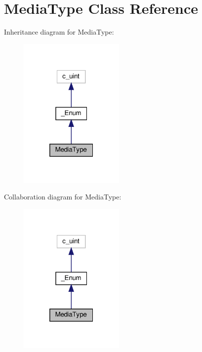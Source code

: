 \hypertarget{classvlc_1_1_media_type}{}\section{Media\+Type Class Reference}
\label{classvlc_1_1_media_type}


Inheritance diagram for Media\+Type\+:
\nopagebreak
\begin{figure}[H]
\begin{center}
\leavevmode
\includegraphics[width=145pt]{classvlc_1_1_media_type__inherit__graph}
\end{center}
\end{figure}


Collaboration diagram for Media\+Type\+:
\nopagebreak
\begin{figure}[H]
\begin{center}
\leavevmode
\includegraphics[width=145pt]{classvlc_1_1_media_type__coll__graph}
\end{center}
\end{figure}
